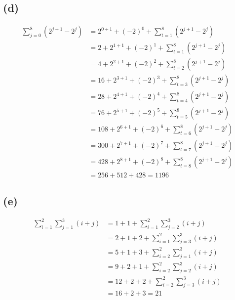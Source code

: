 \documentclass{article}
\begin{document}
\subsection*{(d)}
\begin{equation} \label{eq4}
\begin{split}
\sum\limits_{j=0}^{8}(2^{j+1} - 2^j) & =  2^{0+1} + (-2)^0 + \sum\limits_{t=1}^{8}(2^{j+1} - 2^j) \\
& =  2 + 2^{1+1} + (-2)^1 + \sum\limits_{t=1}^{8}(2^{j+1} - 2^j) \\
& =  4 + 2^{2+1} + (-2)^2 + \sum\limits_{t=2}^{8}(2^{j+1} - 2^j) \\
& =  16 + 2^{3+1} + (-2)^3 + \sum\limits_{t=3}^{8}(2^{j+1} - 2^j) \\
& =  28 + 2^{4+1} + (-2)^4 + \sum\limits_{t=4}^{8}(2^{j+1} - 2^j) \\
& =  76 + 2^{5+1} + (-2)^5 + \sum\limits_{t=5}^{8}(2^{j+1} - 2^j) \\
& =  108 + 2^{6+1} + (-2)^6 + \sum\limits_{t=6}^{8}(2^{j+1} - 2^j) \\
& =  300 + 2^{7+1} + (-2)^7 + \sum\limits_{t=7}^{8}(2^{j+1} - 2^j) \\
& =  428 + 2^{8+1} + (-2)^8 + \sum\limits_{t=8}^{8}(2^{j+1} - 2^j) \\
& =  256+512+428 = 1196
\end{split}
\end{equation}


\subsection*{(e)}
\begin{equation} \label{eq5}
\begin{split}
\sum\limits_{i=1}^{2}\sum\limits_{j=1}^{3}(i + j) & =  1 + 1 + \sum\limits_{i=1}^{2}\sum\limits_{j=2}^{3}(i + j) \\
& =  2 + 1 + 2 + \sum\limits_{i=1}^{2}\sum\limits_{j=3}^{3}(i + j) \\
& =  5 + 1 + 3 + \sum\limits_{i=2}^{2}\sum\limits_{j=1}^{3}(i + j) \\
& =  9 + 2 + 1 + \sum\limits_{i=2}^{2}\sum\limits_{j=2}^{3}(i + j) \\
& =  12 + 2 + 2 + \sum\limits_{i=2}^{2}\sum\limits_{j=3}^{3}(i + j) \\
& =  16 + 2 + 3 = 21\\
\end{split}
\end{equation}
\end{document}
